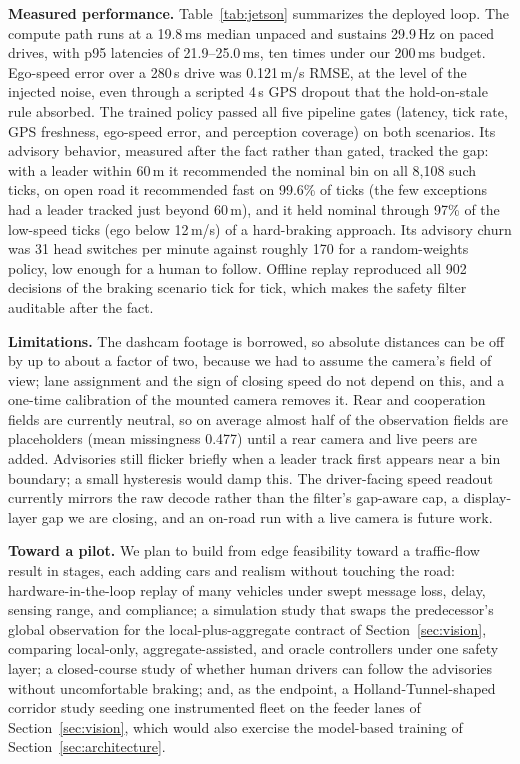 \noindent\textbf{Measured performance.}
Table~\ref{tab:jetson} summarizes the deployed loop. The compute path runs at a 19.8\,ms median unpaced and sustains 29.9\,Hz on paced drives, with p95 latencies of 21.9--25.0\,ms, ten times under our 200\,ms budget. Ego-speed error over a 280\,s drive was 0.121\,m/s RMSE, at the level of the injected noise, even through a scripted 4\,s GPS dropout that the hold-on-stale rule absorbed. The trained policy passed all five pipeline gates (latency, tick rate, GPS freshness, ego-speed error, and perception coverage) on both scenarios. Its advisory behavior, measured after the fact rather than gated, tracked the gap: with a leader within 60\,m it recommended the nominal bin on all 8{,}108 such ticks, on open road it recommended fast on 99.6\% of ticks (the few exceptions had a leader tracked just beyond 60\,m), and it held nominal through 97\% of the low-speed ticks (ego below 12\,m/s) of a hard-braking approach. Its advisory churn was 31 head switches per minute against roughly 170 for a random-weights policy, low enough for a human to follow. Offline replay reproduced all 902 decisions of the braking scenario tick for tick, which makes the safety filter auditable after the fact.

\noindent\textbf{Limitations.}
The dashcam footage is borrowed, so absolute distances can be off by up to about a factor of two, because we had to assume the camera's field of view; lane assignment and the sign of closing speed do not depend on this, and a one-time calibration of the mounted camera removes it. Rear and cooperation fields are currently neutral, so on average almost half of the observation fields are placeholders (mean missingness 0.477) until a rear camera and live peers are added. Advisories still flicker briefly when a leader track first appears near a bin boundary; a small hysteresis would damp this. The driver-facing speed readout currently mirrors the raw decode rather than the filter's gap-aware cap, a display-layer gap we are closing, and an on-road run with a live camera is future work.

\noindent\textbf{Toward a pilot.}
We plan to build from edge feasibility toward a traffic-flow result in stages, each adding cars and realism without touching the road: hardware-in-the-loop replay of many vehicles under swept message loss, delay, sensing range, and compliance; a simulation study that swaps the predecessor's global observation for the local-plus-aggregate contract of Section~\ref{sec:vision}, comparing local-only, aggregate-assisted, and oracle controllers under one safety layer; a closed-course study of whether human drivers can follow the advisories without uncomfortable braking; and, as the endpoint, a Holland-Tunnel-shaped corridor study seeding one instrumented fleet on the feeder lanes of Section~\ref{sec:vision}, which would also exercise the model-based training of Section~\ref{sec:architecture}.
\vspace{-0.35cm}
